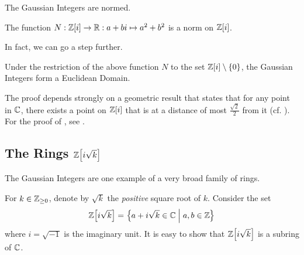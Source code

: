 The Gaussian Integers are normed.

\begin{boxproposition}
    The function $N : \mathbb{Z}\!\left[ i \right] \to \mathbb{R} : a + bi \mapsto a^2 + b^2$ is a norm on $\mathbb{Z}\!\left[ i \right]$.
\end{boxproposition}

In fact, we can go a step further.

\begin{boxtheorem}\label{Ch1:Thm:GaussianIntegersEuclidean}
    Under the restriction of the above function $N$ to the set $\mathbb{Z}\!\left[ i \right] \setminus \left\{ 0 \right\}$, the Gaussian Integers form a Euclidean Domain.
\end{boxtheorem}

The proof depends strongly on a geometric result that states that for any point in $\mathbb{C}$, there exists a point on $\mathbb{Z}\!\left[ i \right]$ that is at a distance of most $\frac{\sqrt{2}}{2}$ from it (cf. \cite[Proposition 2.4]{AmbrusPal}). For the proof of , see \cite[Theorem 2.3]{AmbrusPal}.

\subsection{The Rings $\mathbb{Z}\!\left[ i\sqrt{k} \right]$}

The Gaussian Integers are one example of a very broad family of rings.

\begin{boxdefinition}
    For $k \in \mathbb{Z}_{\geq 0}$, denote by $\sqrt{k}$ the \textit{positive} square root of $k$. Consider the set
    \begin{align}
        \mathbb{Z}\!\left[ i \sqrt{k} \right] = \left\{ a + i\sqrt{k} \in \mathbb{C} \; \middle\vert \; a, b \in \mathbb{Z} \right\}
    \end{align}
    where $i = \sqrt{-1}$ is the imaginary unit. It is easy to show that $\mathbb{Z}\!\left[ i\sqrt{k} \right]$ is a subring of $\mathbb{C}$. 
\end{boxdefinition}

